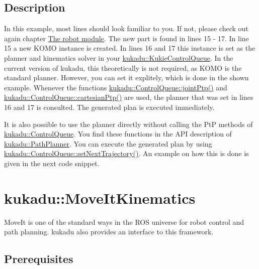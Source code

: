 \subsection*{Description}

In this example, most lines should look familiar to you. If not, please check out again chapter \hyperlink{robotpage}{The robot module}. The new part is found in lines 15 -\/ 17. In line 15 a new K\+O\+MO instance is created. In lines 16 and 17 this instance is set as the planner and kinematics solver in your \hyperlink{classkukadu_1_1KukieControlQueue}{kukadu\+::\+Kukie\+Control\+Queue}. In the current version of kukadu, this theoretically is not required, as K\+O\+MO is the standard planner. However, you can set it explitely, which is done in the shown example. Whenever the functions \hyperlink{classkukadu_1_1ControlQueue_ad11059100321b24a1af8ef7de8314353}{kukadu\+::\+Control\+Queue\+::joint\+Ptp()} and \hyperlink{classkukadu_1_1ControlQueue_a1bfa23a8ce6319f6ef0ed9208e896054}{kukadu\+::\+Control\+Queue\+::cartesian\+Ptp()} are used, the planner that was set in lines 16 and 17 is consulted. The generated plan is executed immediately.

It is also possible to use the planner directly without calling the PtP methods of \hyperlink{classkukadu_1_1ControlQueue}{kukadu\+::\+Control\+Queue}. You find these functions in the A\+PI description of \hyperlink{classkukadu_1_1PathPlanner}{kukadu\+::\+Path\+Planner}. You can execute the generated plan by using \hyperlink{classkukadu_1_1ControlQueue_a0025c5c010a1b33d637e52fb24f767b2}{kukadu\+::\+Control\+Queue\+::set\+Next\+Trajectory()}. An example on how this is done is given in the next code snippet.


\begin{DoxyCodeInclude}
\end{DoxyCodeInclude}


\section*{kukadu\+::\+Move\+It\+Kinematics}

Move\+It is one of the standard ways in the R\+OS universe for robot control and path planning. kukadu also provides an interface to this framework.


\begin{DoxyCodeInclude}
\end{DoxyCodeInclude}


\subsection*{Prerequisites}

